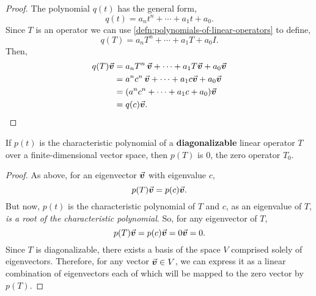 \documentclass[../MathsNotesBase.tex]{subfiles}
\begin{document}
{	
		\bigskip
		\begin{proof}
			The polynomial $q(t)$ has the general form,
			\[ q(t) = a_n t^n + \cdots + a_1 t + a_0. \]
			Since $T$ is an operator we can use \ref{defn:polynomials-of-linear-operators} to define,
			\[ q(T) = a_n T^n + \cdots + a_1 T + a_0 I. \]
			Then,
			\[\begin{aligned}
				q(T)\vec{\bm{v}} &= a_n T^n \, \vec{\bm{v}} + \cdots + a_1 T \vec{\bm{v}} + a_0 \vec{\bm{v}} \\
				&= a^n c^n \, \vec{\bm{v}} + \cdots + a_1 c \vec{\bm{v}} + a_0 \vec{\bm{v}} \\
				&= (a^n c^n + \cdots + a_1 c + a_0) \vec{\bm{v}} \\
				&= q(c)\vec{\bm{v}}. \qedhere
			\end{aligned}\]
		\end{proof}
		\begin{corollary}
			If $p(t)$ is the characteristic polynomial of a \textbf{diagonalizable} linear operator $T$ over a finite-dimensional vector space, then $p(T)$ is 0, the zero operator $T_0$.
		\end{corollary}
		\begin{proof}
			As above, for an eigenvector $\vec{\bm{v}}$ with eigenvalue $c$,
			\[ p(T)\vec{\bm{v}} = p(c)\vec{\bm{v}}. \]
			But now, $p(t)$ is the characteristic polynomial of $T$ and $c$, as an eigenvalue of $T$, \textit{is a root of the characteristic polynomial}. So, for any eigenvector of $T$,
			\[  p(T)\vec{\bm{v}} = p(c)\vec{\bm{v}} = 0\vec{\bm{v}} = 0. \]
			Since $T$ is diagonalizable, there exists a basis of the space $V$ comprised solely of eigenvectors. Therefore, for any vector ${ \vec{\bm{v}} \in V }$, we can express it as a linear combination of eigenvectors each of which will be mapped to the zero vector by $p(T)$.
		\end{proof}
	
}
\end{document}
